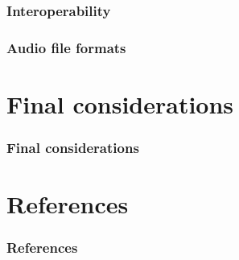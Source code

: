 \documentclass{beamer}
\begin{document}
  
  \begin{frame}
    \frametitle{Interoperability}
  \end{frame}

  

  \begin{frame}
    \frametitle{Audio file formats}
  \end{frame}

  

\section{Final considerations}

  \begin{frame}
    \frametitle{Final considerations}
  \end{frame}



\backupbegin

\section{References}

  \begin{frame}
    \frametitle{References}
  \end{frame}

\backupend
\end{document}
